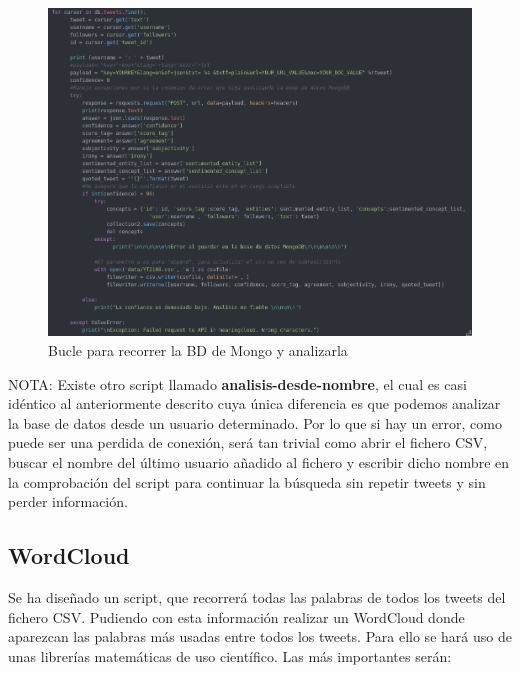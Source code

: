 \begin{figure}[H]
	\centering
	\includegraphics[scale=.35]{imagenes/bucle-analisis.png}
	\caption{Bucle para recorrer la BD de Mongo y analizarla}
	\label{fig:bucle-analisis}
\end{figure}

NOTA: Existe otro script llamado \textbf{analisis-desde-nombre}, el cual es casi idéntico al anteriormente descrito cuya única diferencia es que podemos analizar la base de datos desde un usuario determinado. Por lo que si hay un error, como puede ser una perdida de conexión, será tan trivial como abrir el fichero CSV, buscar el nombre del último usuario añadido al fichero y escribir dicho nombre en la comprobación del script para continuar la búsqueda sin repetir tweets y sin perder información. 



\subsection{WordCloud}

Se ha diseñado un script, que recorrerá todas las palabras de todos los tweets del fichero CSV. Pudiendo con esta información realizar un WordCloud donde aparezcan las palabras más usadas entre todos los tweets. Para ello se hará uso de unas librerías matemáticas de uso científico. Las más importantes serán: 

